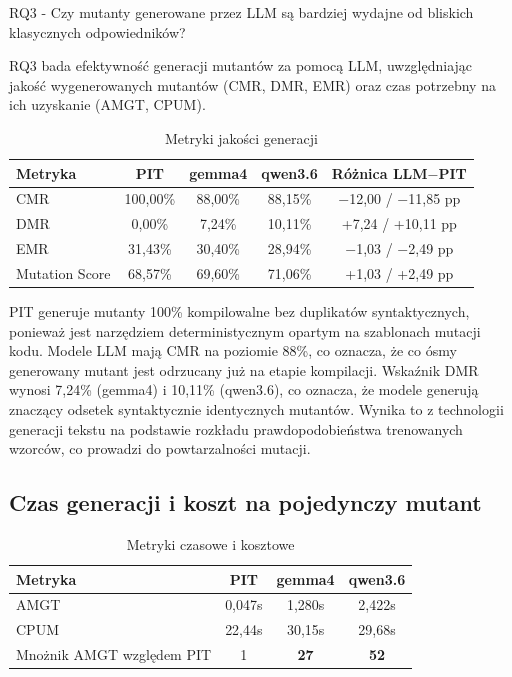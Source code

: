 \documentclass[12pt,a4paper,oldfontcommands]{memoir}
\theoremstyle{plain}
\theoremstyle{definition}
\theoremstyle{remark}
\begin{document}
    RQ3 - Czy mutanty generowane przez LLM są bardziej wydajne od bliskich klasycznych odpowiedników?

    RQ3 bada efektywność generacji mutantów za pomocą LLM, uwzględniając jakość wygenerowanych mutantów (CMR, DMR, EMR) oraz czas potrzebny na ich uzyskanie (AMGT, CPUM).

    \begin{table}[H]
        \centering
        \begin{tabular}{|l|c|c|c|c|}
            \hline
            Metryka & PIT & gemma4 & qwen3.6 & Różnica LLM$-$PIT \\ \hline
            CMR & 100,00\% & 88,00\% & 88,15\% & $-$12,00 / $-$11,85 pp \\ \hline
            DMR & 0,00\% & 7,24\% & 10,11\% & +7,24 / +10,11 pp \\ \hline
            EMR & 31,43\% & 30,40\% & 28,94\% & $-$1,03 / $-$2,49 pp \\ \hline
            Mutation Score & 68,57\% & 69,60\% & 71,06\% & +1,03 / +2,49 pp \\ \hline
        \end{tabular}
        \caption{Metryki jakości generacji}
        \label{tab:jakosc_gen}
    \end{table}

    PIT generuje mutanty 100\% kompilowalne bez duplikatów syntaktycznych, ponieważ jest narzędziem deterministycznym opartym na szablonach mutacji kodu.
    Modele LLM mają CMR na poziomie 88\%, co oznacza, że co ósmy generowany mutant jest odrzucany już na etapie kompilacji.
    Wskaźnik DMR wynosi 7,24\% (gemma4) i 10,11\% (qwen3.6), co oznacza, że modele generują znaczący odsetek syntaktycznie identycznych mutantów.
    Wynika to z technologii generacji tekstu na podstawie rozkładu prawdopodobieństwa trenowanych wzorców, co prowadzi do powtarzalności mutacji.

    \subsection{Czas generacji i koszt na pojedynczy mutant}

    \begin{table}[H]
        \centering
        \begin{tabular}{|l|c|c|c|}
            \hline
            Metryka & PIT & gemma4 & qwen3.6 \\ \hline
            AMGT & 0,047s & 1,280s & 2,422s \\ \hline
            CPUM & 22,44s & 30,15s & 29,68s \\ \hline
            Mnożnik AMGT względem PIT & 1 & \textbf{27} & \textbf{52} \\ \hline
        \end{tabular}
        \caption{Metryki czasowe i kosztowe}
        \label{tab:czas}
    \end{table}
\end{document}
